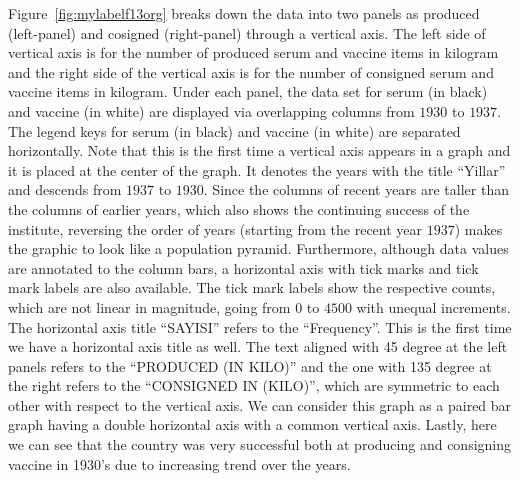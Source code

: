 Figure~\ref{fig:mylabelf13org} breaks down the data into two panels as produced (left-panel) and cosigned (right-panel) through a vertical axis. The left side of vertical axis is for the number of produced serum and  vaccine items in kilogram and the right side of the vertical axis is for the number of consigned serum and vaccine items in kilogram. Under each panel, the data set for serum (in black) and vaccine (in white) are displayed via overlapping columns from $1930$ to $1937$. The legend keys for serum (in black) and vaccine (in white) are separated horizontally. Note that this is the first time a vertical axis appears in a graph and it is placed at the center of the graph. It denotes the years with the title \enquote{Yillar} and descends from $1937$ to $1930$. Since the columns of recent years are taller than the columns of earlier years, which also shows the continuing success of the institute, reversing the order of years (starting from the recent year $1937$) makes the graphic to look like a population pyramid. Furthermore, although data values are annotated to the column bars, a horizontal axis with tick marks and tick mark labels are also available. The tick mark labels show the respective counts, which are not linear in magnitude, going from $0$ to $4500$ with unequal increments. The horizontal axis title \enquote{SAYISI} refers to the \enquote{Frequency}. This is the first time we have a horizontal axis title as well. The text aligned with 45 degree at the left panels refers to the \enquote{PRODUCED (IN KILO)} and the one with 135 degree at the right refers to the \enquote{CONSIGNED IN (KILO)}, which are symmetric to each other with respect to the vertical axis. We can consider this graph as a paired bar graph having a double horizontal axis with a common vertical axis.  Lastly, here we can see that the country was very successful both at producing and consigning vaccine in 1930's due to increasing trend over the years.

